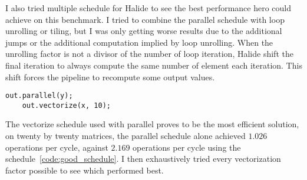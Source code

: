 

I also tried multiple schedule for Halide to see the best performance \gls{hero} could achieve on this benchmark. I tried to combine the parallel schedule with loop unrolling or tiling, but I was only getting worse results due to the additional jumps or the additional computation implied by loop unrolling. When the unrolling factor is not a divisor of the number of loop iteration, Halide shift the final iteration to always compute the same number of element each iteration. This shift forces the pipeline to recompute some output values.

\lstset{basicstyle=\ttfamily\footnotesize,breaklines=true,tabsize=2}
\begin{lstlisting}[caption={Schedule using Parallel and Vectorize}, captionpos=b, label={code:good_schedule}]
	out.parallel(y);
	out.vectorize(x, 10);

\end{lstlisting}

	The vectorize schedule used with parallel proves to be the most efficient solution, on twenty by twenty matrices, the parallel schedule alone achieved $1.026$ operations per cycle, against $2.169$ operations per cycle using the schedule~\ref{code:good_schedule}.
	I then exhaustively tried every vectorization factor possible to see which performed best.








%
